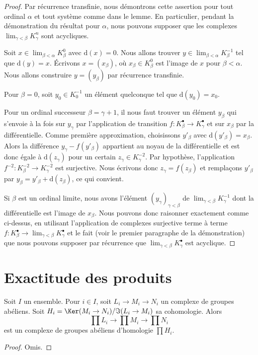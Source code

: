\begin{proof}
Par récurrence transfinie, nous démontrons cette assertion pour tout ordinal
$\alpha$ et tout système comme dans le lemme. En particulier, pendant la
démonstration du résultat pour $\alpha$, nous pouvons supposer que les
complexes $\lim_{\gamma < \beta} K^n_\gamma$ sont acycliques.

\medskip\noindent
Soit $x \in \lim_{\beta < \alpha} K^0_\beta$ avec $\text{d}(x) = 0$.
Nous allons trouver $y \in \lim_{\beta < \alpha} K^{-1}_\beta$
tel que $\text{d}(y) = x$.
Écrivons $x = (x_\beta)$, où $x_\beta \in K_\beta^0$ est l'image de $x$
pour $\beta < \alpha$. Nous allons construire $y = (y_\beta)$
par récurrence transfinie.

\medskip\noindent
Pour $\beta = 0$, soit $y_0 \in K_0^{-1}$
un élément quelconque tel que $\text{d}(y_0) = x_0$.

\medskip\noindent
Pour un ordinal successeur $\beta = \gamma + 1$, il nous faut trouver un
élément $y_\beta$ qui s'envoie à la fois sur $y_\gamma$ par l'application de
transition $f : K^\bullet_\beta \to K^\bullet_\gamma$ et sur $x_\beta$ par
la différentielle. Comme première approximation, choisissons $y'_\beta$ avec
$\text{d}(y'_\beta) = x_\beta$. Alors la différence
$y_\gamma - f(y'_\beta)$ appartient au noyau de la différentielle et est donc
égale à $\text{d}(z_\gamma)$ pour un certain $z_\gamma \in K^{-2}_\gamma$.
Par hypothèse, l'application $f^{-2} : K^{-2}_\beta \to K^{-2}_\gamma$
est surjective. Nous écrivons donc $z_\gamma = f(z_\beta)$
et remplaçons $y'_\beta$ par
$y_\beta = y'_\beta + \text{d}(z_\beta)$, ce qui convient.

\medskip\noindent
Si $\beta$ est un ordinal limite, nous avons l'élément
$(y_\gamma)_{\gamma < \beta}$ de $\lim_{\gamma < \beta} K^{-1}_\gamma$
dont la différentielle est l'image de $x_\beta$. Nous pouvons donc raisonner
exactement comme ci-dessus, en utilisant l'application de complexes
surjective terme à terme
$f : K_\beta^\bullet \to \lim_{\gamma < \beta} K_\gamma^\bullet$
et le fait (voir le premier paragraphe de la démonstration) que nous pouvons
supposer par récurrence que
$\lim_{\gamma < \beta} K_\gamma^\bullet$ est acyclique.
\end{proof}

\section{Exactitude des produits}
\label{section-product-exact}


\begin{lemma}
\label{lemma-product-abelian-groups-exact}
Soit $I$ un ensemble. Pour $i \in I$, soit $L_i \to M_i \to N_i$ un
complexe de groupes abéliens. Soit
$H_i = \Ker(M_i \to N_i)/\Im(L_i \to M_i)$
sa cohomologie. Alors
$$
\prod L_i \to \prod M_i \to \prod N_i
$$
est un complexe de groupes abéliens d'homologie $\prod H_i$.
\end{lemma}

\begin{proof}
Omis.
\end{proof}












